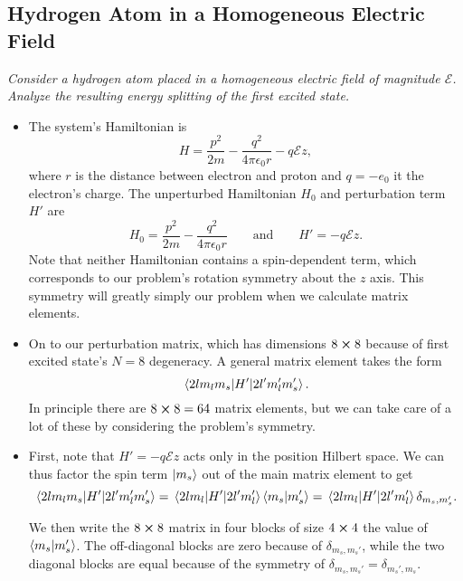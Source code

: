 \documentclass[11pt, a4paper]{article}
\newcommand{\eqtext}[1]{\qquad \text{#1} \qquad}
\newcommand{\Ham}{Hamiltonian\xspace}
\newcommand{\E}{\mathcal{E}}  %
\begin{document}
\subsection{Hydrogen Atom in a Homogeneous Electric Field}
\textit{Consider a hydrogen atom placed in a homogeneous electric field of magnitude $ \E $. Analyze the resulting energy splitting of the first excited state.}
\begin{itemize}
	\item The system's \Ham is 
	\begin{equation*}
		H = \frac{p^{2}}{2m} - \frac{q^{2}}{4\pi \epsilon_{0} r} - q \E z,
	\end{equation*}
	where $ r $ is the distance between electron and proton and $ q = -e_{0} $ it the electron's charge. The unperturbed Hamiltonian $ H_{0} $ and perturbation term $ H' $ are
	\begin{equation*}
		H_{0} = \frac{p^{2}}{2m} - \frac{q^{2}}{4\pi \epsilon_{0} r} \eqtext{and} H' = - q \E z.
	\end{equation*}
	Note that neither \Ham contains a spin-dependent term, which corresponds to our problem's rotation symmetry about the $ z $ axis. This symmetry will greatly simply our problem when we calculate matrix elements. 

	\item On to our perturbation matrix, which has dimensions $ 8 \cross 8 $ because of first excited state's $ N = 8 $ degeneracy. A general matrix element takes the form
	\begin{equation*}
		\mel{2lm_{l}m_{s}}{H'}{2l'm_{l}'m_{s}'}.
	\end{equation*}
	In principle there are $ 8 \cross 8 = 64 $ matrix elements, but we can take care of a lot of these by considering the problem's symmetry. 
	
	\item First, note that $ H' = - q \E z $ acts only in the position Hilbert space. We can thus factor the spin term $ \ket{m_{s}} $ out of the main matrix element to get
	\begin{equation*}
		\mel{2lm_{l}m_{s}}{H'}{2l'm_{l}'m_{s}'} = \mel{2lm_{l}}{H'}{2l'm_{l}'}\braket{m_{s}}{m_{s}'} = \mel{2lm_{l}}{H'}{2l'm_{l}'} \delta_{m_{s}, m_{s}'}.
	\end{equation*}
	
	We then write the $ 8 \cross 8 $ matrix in four blocks  of size $ 4 \cross 4 $ the value of $ \braket{m_{s}}{m_{s}'} $. The off-diagonal blocks are zero because of $ \delta_{m_{s}, m_{s}'} $, while the two diagonal blocks are equal because of the symmetry of $ \delta_{m_{s}, m_{s}'} = \delta_{m_{s}', m_{s}}$. 
	

\end{itemize}
\end{document}
